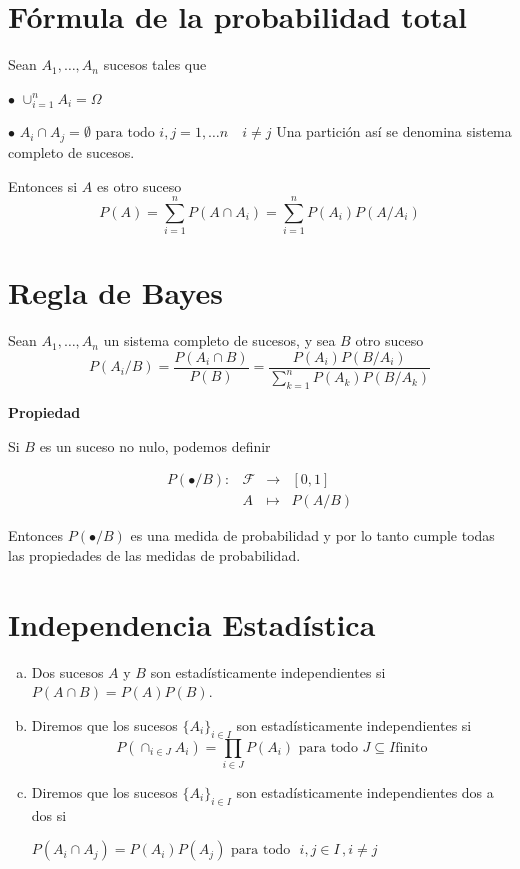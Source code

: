 \documentclass[12pt]{report}
\begin{document}
         \section{Fórmula de la probabilidad total}

         Sean $A_{1},\ldots, A_{n}$ sucesos tales que

         $\bullet$ $\displaystyle \cup_{i=1}^n A_{i} =\Omega$

         $\bullet$ $A_{i}\cap A_{j}=\emptyset\mbox{  para todo } i,j=1,\ldots n \quad
         i\not=j$
         Una partición así se denomina sistema completo de sucesos.

         Entonces si $A$ es otro suceso
         $$P(A)=\sum_{i=1}^{n}P(A\cap A_{i})=\sum_{i=1}^n P(A_{i}) P(A/A_{i})$$



         \section{Regla de  Bayes}
         Sean $A_{1},\ldots,A_{n}$ un sistema completo de sucesos, y sea
         $B$ otro suceso
         $$P(A_{i}/B)=\frac{P(A_{i}\cap B)}{P(B)}=\frac{P(A_{i}) P(B/A_{i})}
         {\sum_{k=1}^n P(A_{k}) P(B/A_{k})}$$





         \textbf{Propiedad}

         Si $B$ es un suceso no nulo, podemos definir

         $$\begin{array}{llcl}
         P(\bullet/B):&\mathcal{F} & \to & [0,1]\\
           & A& \mapsto & P(A/B)\end{array}$$



        Entonces $P(\bullet/B)$ es una medida de probabilidad y por lo tanto
        cumple todas las propiedades de las medidas de probabilidad.





        \section{Independencia Estadística}
        \begin{enumerate}[a)]
            \item Dos sucesos $A$ y $B$ son es\-ta\-dís\-ti\-ca\-men\-te independientes
            si $P(A\cap B)=P(A) P(B)$.
           \item Diremos que los sucesos $\{A_{i}\}_{i\in I}$
           son es\-ta\-dís\-ti\-ca\-men\-te independientes si
           $$P(\cap_{i\in J} A_{i})=\prod_{i\in J}P(A_{i})\mbox{ para todo }
           J\subseteq I\mbox{finito}$$
           \item Diremos que los sucesos $\{A_{i}\}_{i\in I}$
           son es\-ta\-dís\-ti\-ca\-men\-te independientes  dos a dos si

           $P(A_{i}\cap A_{j})=P(A_{i}) P(A_{j})\mbox{ para todo }$\newline
          $i,j\in I \, , i\not=j$
           \end{enumerate}
\end{document}

